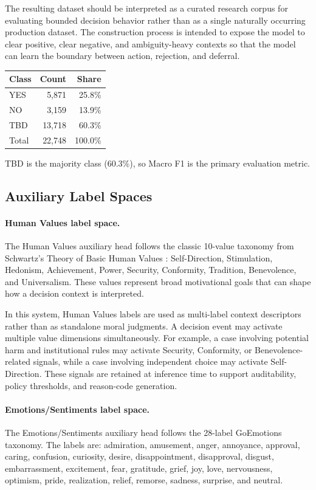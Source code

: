 \documentclass[11pt]{article}
\begin{document}
The resulting dataset should be interpreted as a curated research corpus for evaluating bounded
decision behavior rather than as a single naturally occurring production dataset. The construction
process is intended to expose the model to clear positive, clear negative, and ambiguity-heavy
contexts so that the model can learn the boundary between action, rejection, and deferral.

\begin{center}
\begin{tabular}{lrr}
\toprule
Class & Count & Share \\
\midrule
YES & 5,871 & 25.8\% \\
NO & 3,159 & 13.9\% \\
TBD & 13,718 & 60.3\% \\
Total & 22,748 & 100.0\% \\
\bottomrule
\end{tabular}
\end{center}

TBD is the majority class (60.3\%), so Macro F1 is the primary evaluation metric.

\subsection{Auxiliary Label Spaces}

\paragraph{Human Values label space.}
The Human Values auxiliary head follows the classic 10-value taxonomy from Schwartz's Theory of
Basic Human Values \cite{schwartz2012overview}: Self-Direction, Stimulation, Hedonism,
Achievement, Power, Security, Conformity, Tradition, Benevolence, and Universalism. These values
represent broad motivational goals that can shape how a decision context is interpreted.

In this system, Human Values labels are used as multi-label context descriptors rather than as
standalone moral judgments. A decision event may activate multiple value dimensions simultaneously.
For example, a case involving potential harm and institutional rules may activate Security,
Conformity, or Benevolence-related signals, while a case involving independent choice may activate
Self-Direction. These signals are retained at inference time to support auditability, policy
thresholds, and reason-code generation.

\paragraph{Emotions/Sentiments label space.}
The Emotions/Sentiments auxiliary head follows the 28-label GoEmotions taxonomy. The labels are:
admiration, amusement, anger, annoyance, approval, caring, confusion, curiosity, desire,
disappointment, disapproval, disgust, embarrassment, excitement, fear, gratitude, grief, joy, love,
nervousness, optimism, pride, realization, relief, remorse, sadness, surprise, and neutral.
\end{document}
